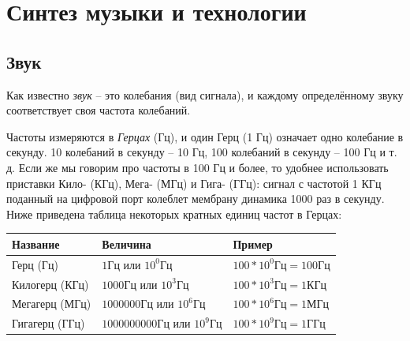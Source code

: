 \documentclass[a4paper,twoside]{book}
\begin{document}

\chapter{Синтез музыки и технологии}

\section{Звук}

Как известно \emph{звук} -- это колебания (вид сигнала), и каждому определённому
звуку соответствует своя частота колебаний.

Частоты измеряются в \emph{Герцах} (Гц), и один Герц (1 Гц) означает одно
колебание в секунду. 10 колебаний в секунду -- 10 Гц, 100 колебаний в секунду --
100 Гц и т. д. Если же мы говорим про частоты в 100 Гц и более, то удобнее
использовать приставки Кило- (КГц), Мега- (МГц) и Гига- (ГГц): сигнал с частотой
1 КГц поданный на цифровой порт колеблет мембрану динамика 1000 раз в секунду.
Ниже приведена таблица некоторых кратных единиц частот в Герцах:

\begin{tabular}{p{3cm}|p{4cm}|p{3.5cm}}
  Название & Величина & Пример \\
  \hline \hline
  Герц (Гц)
  & $ 1 \mbox{Гц} $ или $ 10^0 \mbox{Гц} $
  & $ 100 * 10^0 \mbox{Гц} = 100 \mbox{Гц} $ \\
  \hline
  Килогерц (КГц)
  & $ 1000 \mbox{Гц} $ или $ 10^3 \mbox{Гц} $
  & $ 100 * 10^3 \mbox{Гц} = 1 \mbox{КГц} $ \\
  \hline
  Мегагерц (МГц)
  & $ 1000000 \mbox{Гц} $ или $ 10^6 \mbox{Гц} $
  & $ 100 * 10^6 \mbox{Гц} = 1 \mbox{МГц} $ \\
  \hline
  Гигагерц (ГГц)
  & $ 1000000000 \mbox{Гц} $ или $ 10^9 \mbox{Гц} $
  & $ 100 * 10^9 \mbox{Гц} = 1 \mbox{ГГц} $ \\
\end{tabular}
\end{document}
